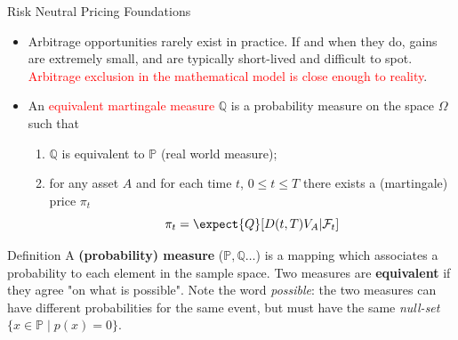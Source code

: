 \documentclass{beamer}
\begin{document}
\begin{frame}{Risk Neutral Pricing Foundations}
	\begin{itemize}
		\item Arbitrage opportunities rarely exist in practice. If and when they do, gains are extremely small, and are typically short-lived and difficult to spot. \textcolor{red}{Arbitrage exclusion in the mathematical model is close enough to reality}.
		\item An \textcolor{red}{equivalent martingale measure} $\mathbb{Q}$ is a probability measure on the space $\Omega$ such that
		\begin{enumerate}
			\item $\mathbb{Q}$ is equivalent to $\mathbb{P}$ (real world measure);
			\item for any asset $A$ and for each time $t$, $0\le t\le T$ there exists a (martingale) price $\pi_t$
			\begin{equation*}
				\pi_t = \expect{Q}[D(t,T)V_A|\mathcal{F}_t]
			\end{equation*}
		\end{enumerate}
	\end{itemize}
    \begin{block}{Definition}
    A \textbf{(probability) measure} ($\mathbb{P}, \mathbb{Q}\ldots$) is a mapping which associates a probability to each element in the sample space. Two measures are \textbf{equivalent} if they agree "on what is possible". Note the word \emph{possible}: the two measures can have different probabilities for the same event, but must have the same \emph{null-set} $\{x\in {\mathbb{P}}\mid p (x)=0\}$.
    \end{block}
\end{frame}
\end{document}
